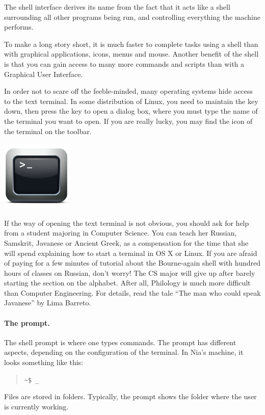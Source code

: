 \documentclass[a4paper,12pt]{book}
\begin{document}
The shell interface derives its name from
the fact that it acts like a shell
surrounding all other programs being run,
and controlling everything the machine performs.

To make a long story short,
it is much faster to complete tasks
using a shell than with graphical applications,
icons, menus and mouse. Another benefit of the
shell is that you can gain access to many
more commands and scripts than with
a Graphical User Interface.

In order not to scare off the feeble-minded,
many operating systems hide access
to the text terminal. In some distribution
of Linux, you need to maintain the  key
down, then press the  key to open a
dialog box, where you must type the
name of the terminal you want to open.
If you are really lucky, you may find
the icon of the terminal  on the
toolbar.

\includegraphics[scale=0.8]{figs/terminal.png}

If the way of opening the text terminal
is not obvious, you should ask for help
from a student majoring in Computer Science.
You can teach her Russian, Samskrit, Javanese
or Ancient Greek, as a compensation
for the time that she will spend explaining
how to start a terminal in 
OS X or Linux. If you are afraid
of paying for a few minutes of tutorial
about the Bourne-again shell
with hundred hours of classes on
Russian, don't worry! The CS
major will give up after barely
starting the section on the alphabet. After all,
Philology is much more difficult
than Computer Engineering.
For details, read the tale ``The man who could speak
Javanese'' by Lima Barreto.

\paragraph{The prompt.} 
The shell prompt
is where one types commands. The prompt
has different aspects, depending on the
configuration of the terminal.
In Nia's machine, it looks something like this:
\begin{quote}
	\verb|~$ _|
\end{quote}
Files are stored in folders. Typically, the
prompt shows the folder where the user is
currently working.
\end{document}
